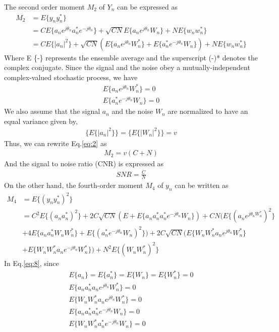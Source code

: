 \documentclass[12pt]{report}
\begin{document}
The second order moment $M_2$ of $Y_n$ can be expressed as
\begin{equation}\label{eq:2}
\begin{aligned}
M_2 &=E\{y_n y_n^*\}\\
&=CE\{a_n e^{j\theta_n} a_n^* e^{-j\theta_n}\}+\sqrt{CN}E\{a_n e^{j\theta_n} W_n\}+NE\{w_n w_n^*\}\\
&=CE\{|a_n|^2\}+\sqrt{CN}(E\{a_n e^{j\theta_n} W_n^*\}+E\{a_n^* e^{-j\theta_n} W_n\})+NE\{w_n w_n^*\}
\end{aligned}
\end{equation}
Where E \{-\} represents the ensemble average and the superscript (-)* denotes the complex conjugate. Since the signal and the noise obey a mutually-independent complex-valued stochastic process, we have
\begin{align}
E\{a_n e^{j\theta_n} W_n^*\}=0\\
E\{a_n^* e^{-j\theta_n} W_n\}=0
\end{align}
We also assume that the signal $a_n$ and the noise $W_n$ are normalized to have an equal variance given by, 
\begin{align}
\{E\{|a_n|^2\}\}=\{E\{|W_n|^2\}\}=v
\end{align}
Thus, we can rewrite Eq.\ref{eq:2} as
\begin{align}
\label{eq:6}
M_2 = v(C+N)
\end{align}
And the signal to noise ratio (CNR) is expressed as
\begin{align}\label{eq:7}
SNR=\frac{C}{N}
\end{align}
On the other hand, the fourth-order moment $M_4$ of $y_n$ can be written as
\begin{equation}\label{eq:8}
\begin{aligned}
M_4&=E\{(y_n y_n^*)^2\}\\
&=C^2E\{(a_n a_n^*)^2\}+2C\sqrt{CN}(E+E\{a_n a_n^* a_n^* e^{-j\theta_n}W_n\})+CN(E\{(a_n e^{j\theta_n W_n^*})^2\}\\&+4E\{a_n a_n^* W_n W_n^*\}+E\{(a_n^* e^{-j\theta_n}W_n)^2\})+2C\sqrt{CN}(E\{W_n W_n^* a_n e^{j\theta_n}W_n^*\}\\&+E\{W_n W_n^* a_n e^{-j\theta_n }W_n^*\})+N^2E\{(W_n W_n^*)^2\}
\end{aligned}
\end{equation}
In Eq.\ref{eq:8}, since
\begin{align}
E\{a_n\}=E\{a_n^*\}=E\{W_n\}=E\{W_n^*\}=0\\
E\{a_n a_n^* a_n e^{j\theta_n} W_n^*\}=0\\
E\{W_n W_n^* a_n e^{j\theta_n} W_n^*\}=0\\
E\{a_n a_n^* a_n^* e^{-j\theta_n} W_n\}=0\\
E\{W_n W_n^* a_n^* e^{-j\theta_n} W_n\}=0
\end{align}
\end{document}
